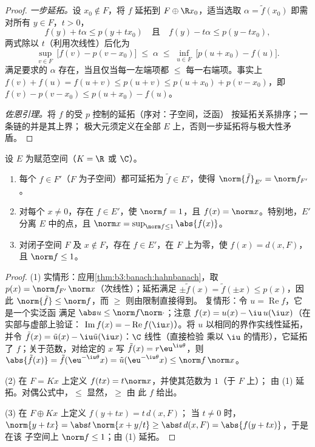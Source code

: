 \begin{proof}
\emph{一步延拓。}设 $x_0 \notin F$，将 $f$ 延拓到
$F \oplus \R x_0$，适当选取 $\alpha = \tilde f(x_0)$
即需对所有 $y \in F$，$t > 0$，
\[
f(y) + t\alpha \leq p(y + tx_0)
\quad\text{且}\quad
f(y) - t\alpha \leq p(y - tx_0),
\]
两式除以 $t$（利用次线性）后化为
\[
\sup_{v \in F}\ \bigl[f(v) - p(v - x_0)\bigr]
\;\leq\; \alpha \;\leq\;
\inf_{u \in F}\ \bigl[p(u + x_0) - f(u)\bigr].
\]
满足要求的 $\alpha$ 存在，当且仅当每一左端项都 $\leq$
每一右端项。事实上 $f(v) + f(u) = f(u + v) \leq p(u + v) \leq
p(u + x_0) + p(v - x_0)$，即 $f(v) - p(v - x_0) \leq p(u +
x_0) - f(u)$。

\emph{佐恩引理。}将 $f$ 的受 $p$ 控制的延拓（序对：子空间，泛函）
按延拓关系排序；一条链的并是其上界；
极大元须定义在全部
$E$ 上，否则一步延拓将与极大性矛盾。
\end{proof}

\begin{corollary}\label{cor:b3:banach:hbnormed}
设 $E$ 为赋范空间（$K = \R$ 或 $\C$）。
\begin{enumerate}
  \item 每个 $f \in F'$（$F$ 为子空间）都可延拓为 $\tilde f
        \in E'$，使得 $\norm{\tilde f}_{E'} = \norm f_{F'}$。
  \item 对每个 $x \neq 0$，存在 $f \in E'$，使 $\norm f
        = 1$，且 $f(x) = \norm x$。特别地，$E'$ 分离
        $E$ 中的点，且 $\norm x = \sup_{\norm f \leq
        1}\abs{f(x)}$。
  \item 对闭子空间 $F$ 及 $x \notin F$，存在 $f
        \in E'$，在 $F$ 上为零，使 $f(x) = d(x, F)$，
        且 $\norm f \leq 1$。
\end{enumerate}
\end{corollary}

\begin{proof}
(1) 实情形：应用\cref{thm:b3:banach:hahnbanach}，取 $p(x)
= \norm f_{F'}\,\norm x$（次线性）；延拓满足
$\pm\tilde f(x) = \tilde f(\pm x) \leq p(x)$，因此
$\norm{\tilde f} \leq \norm f$，而 $\geq$ 则由限制直接得到。
复情形：令 $u = \operatorname{Re}f$，它是一个实泛函
满足 $\abs u \leq \norm f\norm\cdot$；注意 $f(x) = u(x) -
\iu\,u(\iu x)$（在实部与虚部上验证：
$\operatorname{Im}f(x) = -\operatorname{Re}f(\iu x)$）。将
$u$ 以相同的界作实线性延拓，并令 $\tilde f(x) =
\tilde u(x) - \iu\tilde u(\iu x)$：$\C$ 线性（直接检验
乘以 $\iu$ 的情形），它延拓了 $f$；关于范数，对给定的 $x$
写 $\tilde f(x) = r\eu^{\iu\theta}$，则 $\abs{\tilde f(x)}
= \tilde f(\eu^{-\iu\theta}x) = \tilde u(\eu^{-\iu\theta}x)
\leq \norm f\,\norm x$。

(2) 在 $F = Kx$ 上定义 $f(tx) = t\norm x$，并使其范数为 $1$（于 $F$ 上）；
由 (1) 延拓。对偶公式中，$\leq$ 显然，$\geq$ 由
此 $f$ 给出。

(3) 在 $F \oplus Kx$ 上定义 $f(y + tx) = t\,d(x, F)$；
当 $t \neq 0$ 时，$\norm{y + tx} = \abs t\,\norm{x + y/t} \geq \abs
t\,d(x, F) = \abs{f(y + tx)}$，于是在该
子空间上 $\norm f \leq 1$；由 (1) 延拓。
\end{proof}

